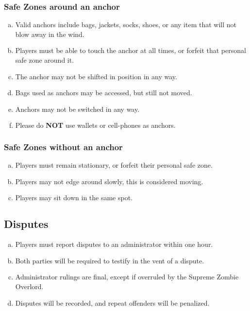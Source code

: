 \documentclass[a4paper,12pt]{article}
\begin{document}
\subsubsection{Safe Zones around an anchor}

\begin{enumerate}[(a)]
    \item Valid anchors include bags, jackets, socks, shoes, or any item that will not blow away in the wind.
    \item Players must be able to touch the anchor at all times, or forfeit that personal safe zone around it.
    \item The anchor may not be shifted in position in any way.
    \item Bags used as anchors may be accessed, but still not moved.
    \item Anchors may not be switched in any way.
    \item Please do {\bf NOT} use wallets or cell-phones as anchors.
\end{enumerate}

\subsubsection{Safe Zones without an anchor}
\begin{enumerate}[(a)]
    \item Players must remain stationary, or forfeit their personal safe zone.
    \item Players may not edge around slowly, this is considered moving.
    \item Players may sit down in the same spot.
\end{enumerate}

\subsection{Disputes}
\begin{enumerate}[(a)]
    \item Players must report disputes to an administrator within one hour.
    \item Both parties will be required to testify in the vent of a dispute.
    \item Administrator rulings are final, except if overruled by the Supreme Zombie Overlord.
    \item Disputes will be recorded, and repeat offenders will be penalized. 
\end{enumerate}
\end{document}
